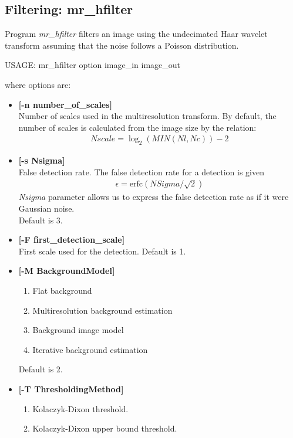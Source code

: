 \begin{itemize}
\subsection{Filtering: mr\_hfilter}
Program {\em mr\_hfilter} filters an image using the undecimated 
Haar wavelet transform assuming  that the noise follows a Poisson 
distribution.
{\bf
\begin{center}
 USAGE: mr\_hfilter option image\_in image\_out
\end{center}}
where options are:
\begin{itemize}
\baselineskip=0.4truecm
\itemsep=0.1truecm
\item {\bf [-n  number\_of\_scales]} \\
 Number of scales used in the multiresolution transform. By default,
 the number of scales is calculated from the image size by the relation:
\begin{eqnarray}
Nscale = \log_2( MIN(Nl,Nc)) - 2
\end{eqnarray}
\item {\bf [-s Nsigma]} \\
False detection rate. The false detection rate for a detection is given
\begin{eqnarray}
\epsilon =  \mbox{erfc}( NSigma / \sqrt{2})
\end{eqnarray}
{\em Nsigma} parameter allows us to express the false detection rate
as if it were Gaussian noise. \\
Default is 3.
\item {\bf [-F first\_detection\_scale]} \\
First scale used for the detection. Default is 1.
\item {\bf [-M BackgroundModel]} 
\begin{enumerate}
\baselineskip=0.4truecm
\itemsep=0.1truecm
\item  Flat background 
\item  Multiresolution background estimation 
\item  Background image model 
\item  Iterative background estimation 
\end{enumerate}
Default is 2.
\item {\bf [-T ThresholdingMethod]} 
\begin{enumerate}
\baselineskip=0.4truecm
\itemsep=0.1truecm
\item Kolaczyk-Dixon threshold.  
\item Kolaczyk-Dixon upper bound threshold.   

\end{enumerate}
\end{itemize}
\end{itemize}
